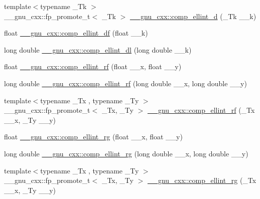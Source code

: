 \begin{DoxyCompactItemize}
\item 
{\footnotesize template$<$typename \+\_\+\+Tk $>$ }\\\+\_\+\+\_\+gnu\+\_\+cxx\+::fp\+\_\+promote\+\_\+t$<$ \+\_\+\+Tk $>$ \hyperlink{group__gnu__math__spec__func_ga3fe79a91524b43ffc5ffb83c0eb2bd00}{\+\_\+\+\_\+gnu\+\_\+cxx\+::comp\+\_\+ellint\+\_\+d} (\+\_\+\+Tk \+\_\+\+\_\+k)
\item 
float \hyperlink{group__gnu__math__spec__func_ga34ac6488b0e7531d5d4b7a8e31ff864e}{\+\_\+\+\_\+gnu\+\_\+cxx\+::comp\+\_\+ellint\+\_\+df} (float \+\_\+\+\_\+k)
\item 
long double \hyperlink{group__gnu__math__spec__func_ga494931ec0a271b79f1fdcfdf929e3138}{\+\_\+\+\_\+gnu\+\_\+cxx\+::comp\+\_\+ellint\+\_\+dl} (long double \+\_\+\+\_\+k)
\item 
float \hyperlink{group__gnu__math__spec__func_ga55ae30b4f8ff15017d18a80050e14e38}{\+\_\+\+\_\+gnu\+\_\+cxx\+::comp\+\_\+ellint\+\_\+rf} (float \+\_\+\+\_\+x, float \+\_\+\+\_\+y)
\item 
long double \hyperlink{group__gnu__math__spec__func_gae1d468487f1711e91719a9c6392f3c35}{\+\_\+\+\_\+gnu\+\_\+cxx\+::comp\+\_\+ellint\+\_\+rf} (long double \+\_\+\+\_\+x, long double \+\_\+\+\_\+y)
\item 
{\footnotesize template$<$typename \+\_\+\+Tx , typename \+\_\+\+Ty $>$ }\\\+\_\+\+\_\+gnu\+\_\+cxx\+::fp\+\_\+promote\+\_\+t$<$ \+\_\+\+Tx, \+\_\+\+Ty $>$ \hyperlink{group__gnu__math__spec__func_gaf6450c88127cf771acfc0667914266d1}{\+\_\+\+\_\+gnu\+\_\+cxx\+::comp\+\_\+ellint\+\_\+rf} (\+\_\+\+Tx \+\_\+\+\_\+x, \+\_\+\+Ty \+\_\+\+\_\+y)
\item 
float \hyperlink{group__gnu__math__spec__func_ga978f8eec6e5edc918b243925dbacb65b}{\+\_\+\+\_\+gnu\+\_\+cxx\+::comp\+\_\+ellint\+\_\+rg} (float \+\_\+\+\_\+x, float \+\_\+\+\_\+y)
\item 
long double \hyperlink{group__gnu__math__spec__func_gaca5fa8ee8125afc8f35ec6b27806e873}{\+\_\+\+\_\+gnu\+\_\+cxx\+::comp\+\_\+ellint\+\_\+rg} (long double \+\_\+\+\_\+x, long double \+\_\+\+\_\+y)
\item 
{\footnotesize template$<$typename \+\_\+\+Tx , typename \+\_\+\+Ty $>$ }\\\+\_\+\+\_\+gnu\+\_\+cxx\+::fp\+\_\+promote\+\_\+t$<$ \+\_\+\+Tx, \+\_\+\+Ty $>$ \hyperlink{group__gnu__math__spec__func_ga389b1ef6cad1e33c1120665a4b915642}{\+\_\+\+\_\+gnu\+\_\+cxx\+::comp\+\_\+ellint\+\_\+rg} (\+\_\+\+Tx \+\_\+\+\_\+x, \+\_\+\+Ty \+\_\+\+\_\+y)
\item 

\end{DoxyCompactItemize}
